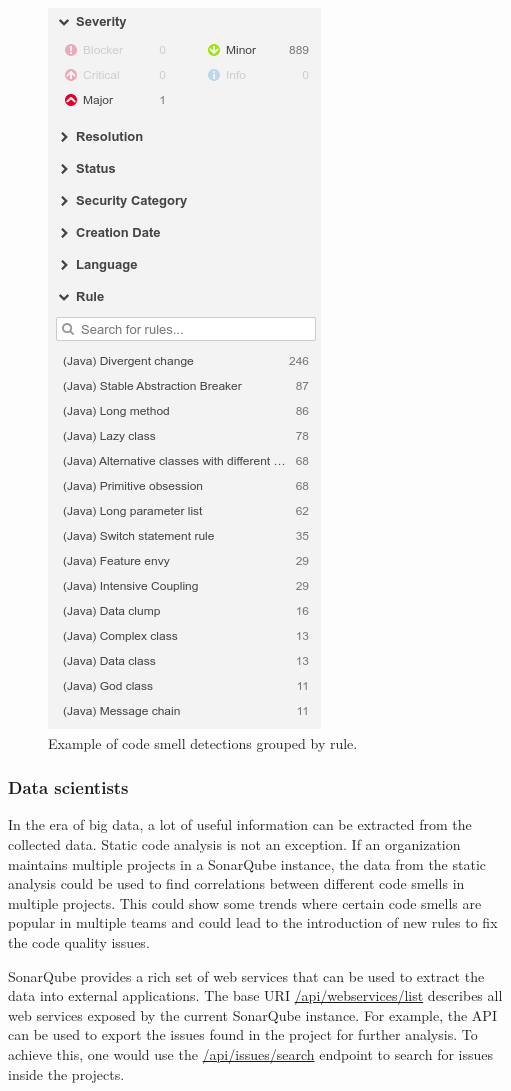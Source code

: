 \begin{figure}
    \centering
    \includegraphics[scale=0.6]{figures/pm_2_1.png}
    \caption{Example of code smell detections grouped by rule.}
    \label{fig:spm_2}
\end{figure}

\FloatBarrier

\subsubsection{Data scientists}

In the era of big data, a lot of useful information can be extracted from the collected data.
Static code analysis is not an exception.
If an organization maintains multiple projects in a SonarQube instance, the data from the static
analysis could be used to find correlations between different code smells in multiple projects.
This could show some trends where certain code smells are popular in multiple teams and could
lead to the introduction of new rules to fix the code quality issues.

SonarQube provides a rich set of web services that can be used to extract the data into external applications.
The base URI \url{/api/webservices/list} describes all web services exposed by the current SonarQube instance.
For example, the API can be used to export the issues found in the project for further analysis.
To achieve this, one would use the \url{/api/issues/search} endpoint to search for issues inside the projects.
